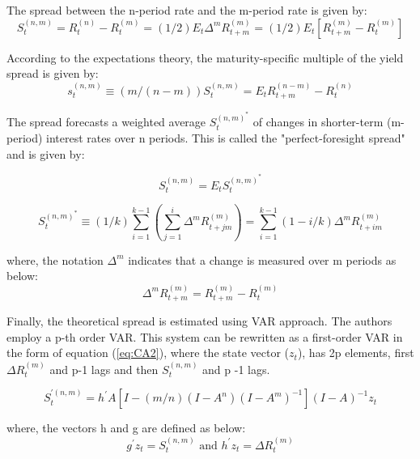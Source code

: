 \documentclass[11pt]{article}
\begin{document}
The spread between the n-period rate and the m-period rate is given by:
\begin{equation} \label{eq1}
S_{t}^{(n, m)}={R_{t}^{(n)}-R_{t}^{(m)}}=(1/2) E_{t} \Delta^{m} R_{t+m}^{(m)}=(1 / 2) E_{t}\left[R_{t+m}^{(m)}-R_{t}^{(m)}\right]
\end{equation}

According to the expectations theory, the maturity-specific multiple of the yield spread is given by:
\begin{equation} \label{eq6}
s_{t}^{(n, m)} \equiv(m /(n-m)) S_{t}^{(n, m)}=E_{t} R_{t+m}^{(n-m)}-R_{t}^{(n)}
\end{equation}

The spread forecasts a weighted average $S_{t}^{(n, m)^*}$ of changes in shorter-term
(m-period) interest rates over n periods. This is called the "perfect-foresight spread" and is given by:

\begin{equation} \label{eq3}
S_{t}^{(n, m)}=E_{t} S_{t}^{(n, m)^{*}}
\end{equation}

\begin{equation} \label{eq4}
S_{t}^{(n, m)^{*}} \equiv(1 / k) \sum_{i=1}^{k-1}\left(\sum_{j=1}^{i} \Delta^{m} R_{t+j m}^{(m)}\right)=\sum_{i=1}^{k-1}(1-i / k) \Delta^{m} R_{t+i m}^{(m)}
\end{equation}

where, the notation $\Delta^{m}$ indicates that a change is measured over m periods as below:
\begin{equation}
\Delta^{m} R_{t+m}^{(m)}=R_{t+m}^{(m)}-R_{t}^{(m)}
\end{equation}

Finally, the theoretical spread is estimated using VAR approach. The authors employ a p-th order VAR. This system can be rewritten as a first-order VAR in the form of equation (\ref{eq:CA2}), where the state vector ($z_{t}$), has 2p
elements, first $\Delta R_{t}^{(m)}$ and p-1 lags and then $S_{t}^{(n, m)}$ and p -1 lags.

\begin{equation} \label{eq5}
S_{t}^{\prime (n,m)} = h^{\prime} A\left[I-(m/n)\left(I-A^{n}\right)\left(I-A^{m}\right)^{-1}\right](I-A)^{-1} z_{t}
\end{equation}

where, the vectors h and g are defined as below:
\begin{equation}
g^{\prime} z_{t}=S_{t}^{(n, m)} \text { and } h^{\prime} z_{t}=\Delta R_{t}^{(m)}
\end{equation}
\end{document}
